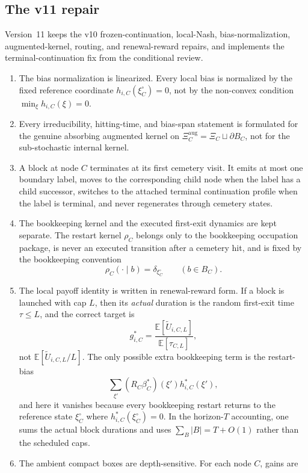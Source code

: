 \documentclass[12pt]{article}
\theoremstyle{definition}
\newcommand{\E}{\mathbb{E}}
\newcommand{\1}{\mathbf{1}}
\begin{document}
\subsection{The v11 repair}

Version~11 keeps the v10 frozen-continuation, local-Nash, bias-normalization,
augmented-kernel, routing, and renewal-reward repairs, and implements the
terminal-continuation fix from the conditional review.

\begin{enumerate}[label=\textnormal{(\arabic*)},leftmargin=2.4em]
\item The bias normalization is linearized. Every local bias is normalized by the
fixed reference coordinate $h_{i,C}(\xi_C^\circ)=0$, not by the non-convex
condition $\min_\xi h_{i,C}(\xi)=0$.
\item Every irreducibility, hitting-time, and bias-span statement is formulated
for the genuine absorbing augmented kernel on
$\Xi_C^{\mathrm{aug}}=\Xi_C\sqcup\partial B_C$, not for the sub-stochastic
internal kernel.
\item A block at node $C$ terminates at its first cemetery visit. It emits at
most one boundary label, moves to the corresponding child node when the label
has a child successor, switches to the attached terminal continuation profile
when the label is terminal, and never regenerates through cemetery states.
\item The bookkeeping kernel and the executed first-exit dynamics are kept
separate. The restart kernel $\rho_C$ belongs only to the bookkeeping occupation
package, is never an executed transition after a cemetery hit, and is fixed by
the bookkeeping convention
\[
\rho_C(\cdot\mid b)=\delta_{\xi_C^\circ}
\qquad (b\in B_C).
\]
\item The local payoff identity is written in renewal-reward form. If a block is
launched with cap $L$, then its \emph{actual} duration is the random first-exit
time $\tau\le L$, and the correct target is
\[
g_{i,C}^*
=
\frac{\E[\widetilde U_{i,C,L}]}{\E[\tau_{C,L}]},
\]
not $\E[\widetilde U_{i,C,L}/L]$. The only possible extra bookkeeping term is the
restart-bias
\[
\sum_{\xi'}(R_C\beta_C^*)(\xi')h_{i,C}^*(\xi'),
\]
and here it vanishes because every bookkeeping restart returns to the reference
state $\xi_C^\circ$ where $h_{i,C}^*(\xi_C^\circ)=0$. In the horizon-$T$
accounting, one sums the actual block durations and uses
$\sum_B |B| = T + O(1)$ rather than the scheduled caps.
\item The ambient compact boxes are depth-sensitive. For each node $C$, gains are

\end{enumerate}
\end{document}
